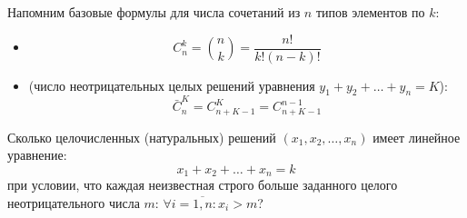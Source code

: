 \begin{proposition}
    Напомним базовые формулы для числа сочетаний из $n$ типов элементов 
    по $k$:
    \begin{itemize}
        \item {}
        \begin{equation} \label{eq:comb_no_rep_sem5}
            C_n^k = \binom{n}{k} = \frac{n!}{k!(n - k)!} \tag{10}
        \end{equation}
        \item {} (число неотрицательных 
        целых решений уравнения $y_1 + y_2 + \dots + y_n = K$):
        \begin{equation} \label{eq:comb_rep_sem5}
            \bar{C}_n^K = C_{n+K-1}^K = C_{n+K-1}^{n-1} \tag{11}
        \end{equation}
    \end{itemize}
\end{proposition}

\begin{problem}
    Сколько целочисленных (натуральных) решений $(x_1, x_2, \dots, x_n)$ 
    имеет линейное уравнение:
    \begin{equation} \label{eq:eq_nat_sol}
        x_1 + x_2 + \dots + x_n = k \tag{12}
    \end{equation}
    при условии, что каждая неизвестная строго больше заданного целого 
    неотрицательного числа $m$: $\forall i = \overline{1, n} : x_i > m$?
\end{problem}

